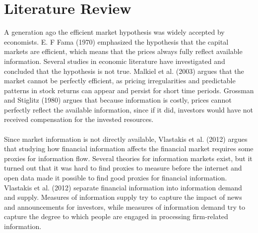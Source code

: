 
\chapter{Literature Review}
A generation ago the efficient market hypothesis was widely accepted by economists. E. F Fama (1970) emphasized the hypothesis that the capital markets are efficient, which means that the prices always fully reflect available information. Several studies in economic literature have investigated and concluded that the hypothesis is not true. Malkiel et al. (2003) argues that the market cannot be perfectly efficient, as pricing irregularities and predictable patterns in stock returns can appear and persist for short time periods. Grossman and Stiglitz (1980) argues that because information is costly, prices cannot perfectly reflect the available information, since if it did, investors would have not received compensation for the invested resources.
\\\\
Since market information is not directly available, Vlastakis et al. (2012) argues that studying how financial information affects the financial market requires some proxies for information flow. Several theories for information markets exist, but it turned out that it was hard to find proxies to measure before the internet and open data made it possible to find good proxies for financial information. Vlastakis et al. (2012)  separate financial information into information demand and supply. Measures of information supply try to capture the impact of news and announcements for investors, while measures of information demand try to capture the degree to which people are engaged in processing firm-related information.

\cleardoublepage